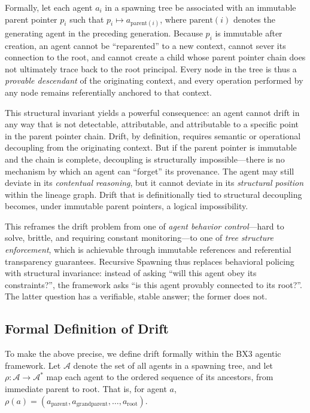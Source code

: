 Formally, let each agent $a_i$ in a spawning tree be associated with an immutable parent pointer $p_i$ such that $p_i \mapsto a_{\text{parent}(i)}$, where $\text{parent}(i)$ denotes the generating agent in the preceding generation. Because $p_i$ is immutable after creation, an agent cannot be ``reparented'' to a new context, cannot sever its connection to the root, and cannot create a child whose parent pointer chain does not ultimately trace back to the root principal. Every node in the tree is thus a \textit{provable descendant} of the originating context, and every operation performed by any node remains referentially anchored to that context.

This structural invariant yields a powerful consequence: an agent cannot drift in any way that is not detectable, attributable, and attributable to a specific point in the parent pointer chain. Drift, by definition, requires semantic or operational decoupling from the originating context. But if the parent pointer is immutable and the chain is complete, decoupling is structurally impossible—there is no mechanism by which an agent can ``forget'' its provenance. The agent may still deviate in its \textit{contentual reasoning}, but it cannot deviate in its \textit{structural position} within the lineage graph. Drift that is definitionally tied to structural decoupling becomes, under immutable parent pointers, a logical impossibility.

This reframes the drift problem from one of \textit{agent behavior control}—hard to solve, brittle, and requiring constant monitoring—to one of \textit{tree structure enforcement}, which is achievable through immutable references and referential transparency guarantees. Recursive Spawning thus replaces behavioral policing with structural invariance: instead of asking ``will this agent obey its constraints?'', the framework asks ``is this agent provably connected to its root?''. The latter question has a verifiable, stable answer; the former does not.

\subsection{Formal Definition of Drift}

To make the above precise, we define drift formally within the BX3 agentic framework. Let $\mathcal{A}$ denote the set of all agents in a spawning tree, and let $\rho: \mathcal{A} \to \mathcal{A}^*$ map each agent to the ordered sequence of its ancestors, from immediate parent to root. That is, for agent $a$, $\rho(a) = (a_{\text{parent}}, a_{\text{grandparent}}, \ldots, a_{\text{root}})$.

